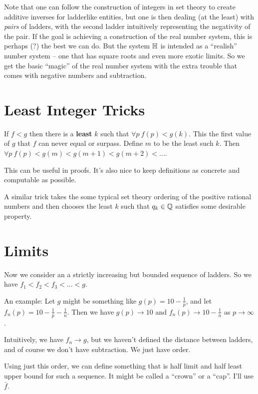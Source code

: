 \documentclass{article}
\renewcommand{\i}{\textit}
\renewcommand{\b}{\textbf}
\newcommand{\q}{\enquote}
\renewcommand{\H}{\Bbb H}
\renewcommand{\l}[1]{ #1  }
\begin{document}
{{Note that one can follow the construction of integers in set theory to create additive inverses for ladderlike entities, but one is then dealing (at the least) with \i{pairs} of ladders, with the second ladder intuitively representing the negativity of the pair. If the goal is achieving a construction of the real number system, this is perhaps (?) the best we can do. But the system $\H$ is intended as a \q{realish} number system -- one that has square roots and even more exotic limits. So we get the basic \q{magic} of the real number system with the extra trouble that comes with negative numbers and subtraction. 

\section{Least Integer Tricks}

If $\l{f} < \l{g}$ then there is a \b{least} $k$ such that $\forall p \ f(p) < g(k)$. This the first value of $g$ that $f$ can never equal or surpass. Define $m$ to be the least such $k$. Then $\forall p \ f(p) < g(m) < g(m + 1) < g(m + 2) < ...$. 

This can be useful in proofs. It's also nice to keep definitions as concrete and computable as possible.

A similar trick takes the some typical set theory ordering of the positive rational numbers and then chooses the least $k$ such that $q_k \in \Bbb Q$ satisfies some desirable property. }}

\section{Limits}

Now we consider an a strictly increasing but bounded sequence of ladders. So we have $\l{f_1}  < \l{f_2}  < \l{f_3} < ... < \l{g}$.  

An example: Let $g$ might be something like $g(p) = 10 - \frac{1}{p}$, and let $f_n(p) = 10 - \frac{1}{p} - \frac{1}{n}$. Then we have $g(p) \to 10$ and $f_n(p) \to 10 - \frac{1}{n}$ as $p \to \infty$.

Intuitively, we have $\l{f_n} \to \l{g}$, but we haven't defined the distance between ladders, and of course we don't have subtraction. We just have order.


Using just this order, we can define something that is half limit and half least upper bound for such a sequence. It might be called a \q{crown} or a \q{cap}. I'll use $\l{\bar f}$.
\end{document}
